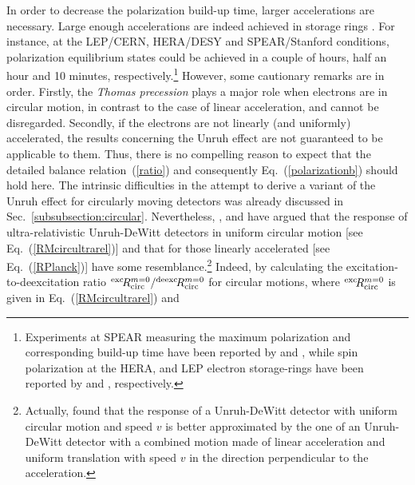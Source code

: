\documentclass[12pt,nofootinbib,floatfix,aps,prd,showpacs,amsmath,amssymb,eqsecnum]{revtex4-2}
\let\cite\citep
\begin{document}
In order to decrease the polarization build-up time, larger accelerations
are necessary. Large enough accelerations are
indeed achieved in storage rings \cite{Barber99}. 
For instance, 
at the LEP/CERN, HERA/DESY and SPEAR/Stanford conditions, polarization
equilibrium states could be achieved in a couple of hours, half an hour 
and 
10 minutes, 
respectively.\footnote{Experiments at SPEAR measuring the maximum 
polarization and corresponding build-up time have been reported 
by \textcite{Camerinietal75} and \textcite{Johnsonetal83}, 
while spin polarization at the HERA, and LEP electron storage-rings
have been reported by \textcite{Barberetal94} and 
\textcite{Knudsenetal91,Assmannetal95}, 
respectively.                  } 
However, some cautionary remarks are in order. 
Firstly, the {\em Thomas precession} plays a major role when electrons 
are in circular motion, in contrast to 
the case of linear acceleration, and cannot 
be disregarded. Secondly, if the electrons are not linearly (and
uniformly) accelerated, the results concerning the Unruh effect are not
guaranteed to be applicable to them.
Thus, there is no compelling reason to expect that the detailed balance 
relation~(\ref{ratio}) and consequently Eq.~(\ref{polarizationb}) should
hold here. The intrinsic difficulties in the attempt to 
derive a variant of the Unruh effect for circularly moving detectors 
was already 
discussed in Sec.~\ref{subsubsection:circular}. Nevertheless, 
\textcite{Letawetal80}, \textcite{Belletal83} 
and \textcite{Takagi86} have argued that the response 
of ultra-relativistic Unruh-DeWitt detectors 
in uniform circular motion [see Eq.~(\ref{RMcircultrarel})] 
and that for those 
linearly accelerated [see Eq.~(\ref{RPlanck})] have some 
resemblance.\footnote{Actually, 
                                \textcite{Takagi84} found that the response 
                                of a Unruh-DeWitt detector with 
                                uniform circular motion and speed 
                                $v$ is better approximated by the 
                                one of an Unruh-DeWitt detector 
                                with a combined motion made of
                                linear acceleration and uniform 
                                translation with speed $v$ in the
                                direction perpendicular to the acceleration.}
Indeed, by calculating the excitation-to-deexcitation ratio 
$^{\rm exc}\! R^{m=0}_{\rm circ}/ ^{\rm deexc}\! R^{m=0}_{\rm circ}$
for circular motions, where $^{\rm exc}\! R^{m=0}_{\rm circ}$
is given in Eq.~(\ref{RMcircultrarel}) and  
\end{document}
